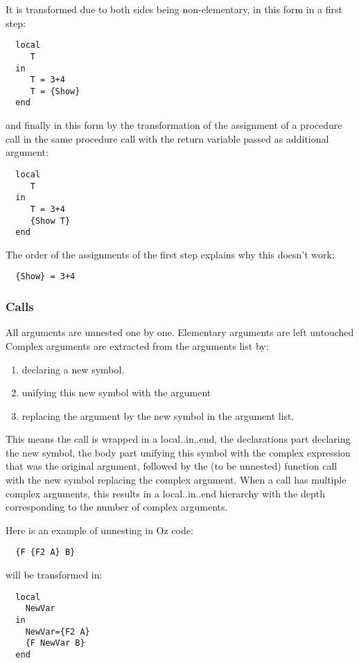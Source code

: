 \documentclass[a4paper]{memoir}
\begin{document}
It is transformed due to both sides being non-elementary, in this form in a first step:
\begin{lstlisting}
  local
     T
  in
     T = 3+4
     T = {Show}
  end
\end{lstlisting}
and finally in this form by the transformation of the assignment of a procedure call in the same procedure call with the return variable passed as additional argument:
\begin{lstlisting}
  local
     T
  in
     T = 3+4
     {Show T}
  end
\end{lstlisting}
The order of the assignments of the first step explains why this doesn't work:
\begin{lstlisting}
  {Show} = 3+4
\end{lstlisting}

\subsubsection{Calls}\label{sec:arch:unnester:calls}
All arguments are unnested one by one. Elementary arguments are left untouched
Complex arguments are extracted from the arguments list by:
\begin{enumerate}
  \item declaring a new symbol. 
  \item unifying this new symbol with the argument
  \item replacing the argument by the new symbol in the argument list.
\end{enumerate}

 This means the call is wrapped in a local..in..end, the declarations part declaring the new symbol, the body part unifying this symbol with the complex expression that was the original argument, followed by the (to be unnested) function call with the new symbol replacing the complex argument. When a call has multiple complex arguments, this results in a local..in..end hierarchy with the depth corresponding to the number of complex arguments. %

Here is an example of unnesting in Oz code:
\begin{lstlisting}
  {F {F2 A} B}
\end{lstlisting}
will be transformed in:
\begin{lstlisting}
  local
    NewVar
  in
    NewVar={F2 A}
    {F NewVar B}
  end
\end{lstlisting}
\end{document}
